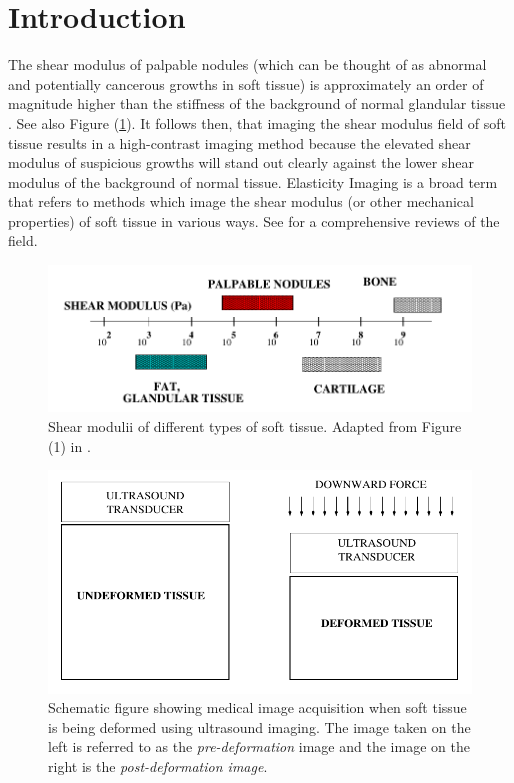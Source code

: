 \documentclass[12pt]{article}
\begin{document}
\section{Introduction}
The shear modulus of palpable nodules (which can be thought of as abnormal and potentially cancerous growths in soft tissue) is approximately an order of magnitude higher than the stiffness of the background of normal glandular tissue \cite{paper:sarv1998}. See also Figure (\ref{fig:shearmod}). It follows then, that imaging the shear modulus field of soft tissue results in a high-contrast imaging method because the elevated shear modulus of suspicious growths will stand out clearly against the lower shear modulus of the background of normal tissue. Elasticity Imaging is a broad term that refers to methods which image the shear modulus (or other mechanical properties) of soft tissue in various ways. See \cite{paper:gao1996,paper:parker2010,book:alamgarra2019,bookchap:oberaibarbone2019} for a comprehensive reviews of the field.
%
\begin{figure}[h]
   \centering
    \includegraphics[totalheight=3cm]{Figures/shearmod.png}
  \caption{\label{fig:shearmod} Shear modulii of different types of soft tissue. Adapted from Figure (1) in \cite{paper:sarv1998}.}
\end{figure}
%
\begin{figure}[h]
   \centering
    \includegraphics[totalheight=5cm]{Figures/prepostimage.png}
  \caption{\label{fig:prepostimage} Schematic figure showing medical image acquisition when soft tissue is being deformed using ultrasound imaging. The image taken on the left is referred to as the \textit{pre-deformation} image and the image on the right is the \textit{post-deformation image}.}
\end{figure}
%
\end{document}
